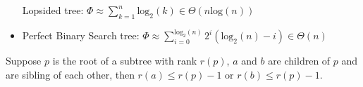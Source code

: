 \documentclass[12pt]{article}
\begin{document}
\begin{itemize}
\begin{minipage}[t]{\linewidth}
              Lopsided tree: $\Phi \approx \sum_{k=1}^{n} \text{log}_2(k) \in \Theta(n\text{log}(n))$
        \end{minipage}
    \item
        \begin{minipage}[t]{\linewidth}
              \raggedright
              \medskip

              Perfect Binary Search tree: $\Phi \approx \sum_{i=0}^{\text{log}_2(n)} 2^i(\text{log}_2(n) - i) \in \Theta(n)$
        \end{minipage}
\end{itemize}

\begin{claim} Suppose $p$ is the root of a subtree with rank $r(p)$, $a$ and
    $b$ are children of $p$ and are sibling of each other, then $r(a) \leq r(p) - 1$ or $r(b) \leq
    r(p) - 1 $. 
\end{claim}
\end{document}
